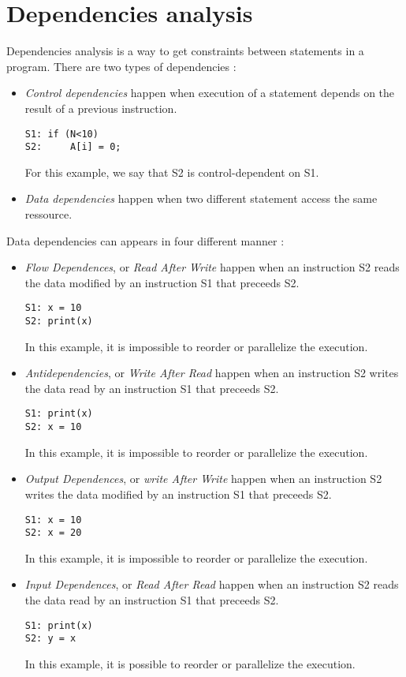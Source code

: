 \section{Dependencies analysis}
Dependencies analysis is a way to get constraints between statements in a program. There are two types of dependencies :
\begin{itemize}
\item \emph{Control dependencies} happen when execution of a statement depends on the result of a previous instruction. 
\begin{lstlisting}
S1: if (N<10)
S2:     A[i] = 0;
\end{lstlisting}

For this example, we say that S2 is control-dependent on S1.


\item \emph{Data dependencies} happen when two different statement access the same ressource.
\end{itemize}

Data dependencies can appears in four different manner :
\begin{itemize}
\item \emph{Flow Dependences}, or \emph{Read After Write} happen when an instruction S2 reads the data modified by an instruction S1 that preceeds S2. 
\begin{lstlisting}
S1: x = 10
S2: print(x)
\end{lstlisting}
In this example, it is impossible to reorder or parallelize the execution.

\item \emph{Antidependencies}, or \emph{Write After Read} happen when an instruction S2 writes the data read by an instruction S1 that preceeds S2.
\begin{lstlisting}
S1: print(x)
S2: x = 10
\end{lstlisting}
In this example, it is impossible to reorder or parallelize the execution.

\item \emph{Output Dependences}, or \emph{write After Write} happen when an instruction S2 writes the data modified by an instruction S1 that preceeds S2.
\begin{lstlisting}
S1: x = 10
S2: x = 20
\end{lstlisting}
In this example, it is impossible to reorder or parallelize the execution.

\item \emph{Input Dependences}, or \emph{Read After Read} happen when an instruction S2 reads the data read by an instruction S1 that preceeds S2. 
\begin{lstlisting}
S1: print(x)
S2: y = x
\end{lstlisting}
In this example, it is possible to reorder or parallelize the execution.
\end{itemize}

